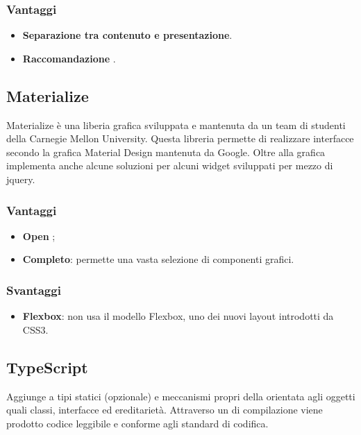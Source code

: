 \subsubsection{Vantaggi}
\begin{itemize}
\item \textbf{Separazione tra contenuto e presentazione}.
\item \textbf{Raccomandazione }.
\end{itemize}

\subsection{Materialize}
Materialize è una liberia grafica sviluppata e mantenuta da un team di studenti della Carnegie Mellon University. Questa libreria permette di realizzare interfacce secondo la grafica Material Design mantenuta da Google. Oltre alla grafica implementa anche alcune soluzioni per alcuni widget sviluppati per mezzo di jquery.
\subsubsection{Vantaggi}
\begin{itemize}
\item \textbf{Open };
\item \textbf{Completo}: permette una vasta selezione di componenti grafici.
\end{itemize}
\subsubsection{Svantaggi}
\begin{itemize}
\item \textbf{Flexbox}: non usa il modello Flexbox, uno dei nuovi layout introdotti da CSS3.
\end{itemize}

\subsection{TypeScript}
Aggiunge a  tipi statici (opzionale) e meccanismi propri della  orientata agli oggetti quali classi, interfacce ed ereditariet\`a. Attraverso un  di compilazione viene prodotto codice  leggibile e conforme agli standard di codifica. 
